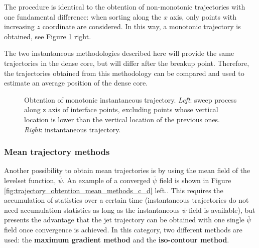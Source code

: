 The procedure is identical to the obtention of non-monotonic trajectories with one fundamental difference: when sorting along the $x$ axis, only points with increasing $z$ coordinate are considered. In this way, a monotonic trajectory is obtained, see Figure \ref{fig:trajectory_obtention_instantaneous_method_b} right. 

The two instantaneous methodologies described here will provide the same trajectories in the dense core, but will differ after the breakup point. Therefore, the trajectories obtained from this methodology can be compared and used to estimate an average position of the dense core. 


\begin{figure}[ht]
     \centering
     \begin{subfigure}[b]{0.45\textwidth}
         \centering
     \end{subfigure}
     \begin{subfigure}[b]{0.45\textwidth}
         \centering
     \end{subfigure}
        \caption[Obtention of monotonic instantaneous trajectory]{Obtention of monotonic instantaneous trajectory. \textsl{Left}: sweep process along z axis of interface points, excluding points whose vertical location is lower than the vertical location of the previous ones. \textsl{Right}: instantaneous trajectory.}
        \label{fig:trajectory_obtention_instantaneous_method_b}
\end{figure}



\subsubsection{Mean trajectory methods}

Another possibility to obtain mean trajectories is by using the mean field of the levelset function, $\overline{\psi}$. An example of a converged $\overline{\psi}$ field is shown in Figure \ref{fig:trajectory_obtention_mean_methods_c_d} left.. This requires the accumulation of statistics over a certain time (instantaneous trajectories do not need accumulation statistics as long as the instantaneous $\psi$ field is available), but presents the advantage that the jet trajectory can be obtained with one single $\overline{\psi}$ field once convergence is achieved. In this category, two different methods are used: the \textbf{maximum gradient method} and the \textbf{iso-contour method}.


